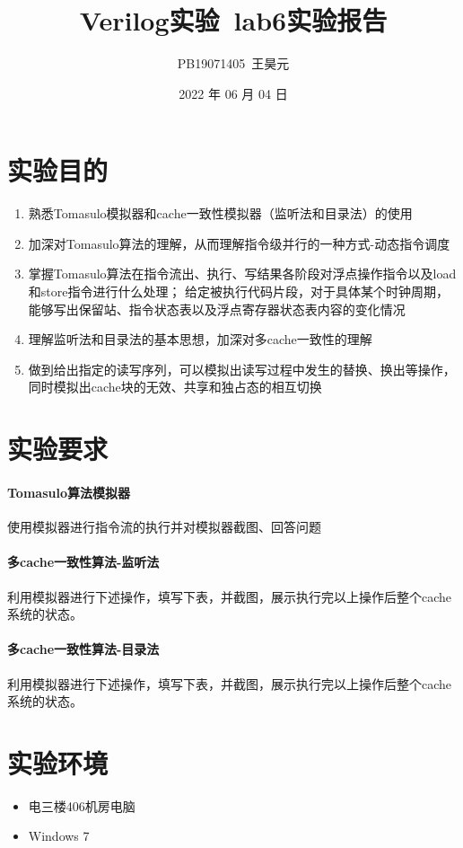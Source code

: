 \documentclass[UTF8]{article}
\title{Verilog实验\ lab6实验报告}
\author{PB19071405\ 王昊元}
\date{2022 年 06 月 04 日}
\begin{document}
    \maketitle
    \section{实验目的}
    \begin{enumerate}
        \item 熟悉Tomasulo模拟器和cache一致性模拟器（监听法和目录法）的使用
        \item 加深对Tomasulo算法的理解，从而理解指令级并行的一种方式-动态指令调度
        \item 掌握Tomasulo算法在指令流出、执行、写结果各阶段对浮点操作指令以及load和store指令进行什么处理；
        给定被执行代码片段，对于具体某个时钟周期，能够写出保留站、指令状态表以及浮点寄存器状态表内容的变化情况
        \item 理解监听法和目录法的基本思想，加深对多cache一致性的理解
        \item 做到给出指定的读写序列，可以模拟出读写过程中发生的替换、换出等操作，同时模拟出cache块的无效、共享和独占态的相互切换
    \end{enumerate}
    \section{实验要求}
    \paragraph{Tomasulo算法模拟器}
    使用模拟器进行指令流的执行并对模拟器截图、回答问题
    \paragraph{多cache一致性算法-监听法}
    利用模拟器进行下述操作，填写下表，并截图，展示执行完以上操作后整个cache系统的状态。
    \paragraph{多cache一致性算法-目录法}
    利用模拟器进行下述操作，填写下表，并截图，展示执行完以上操作后整个cache系统的状态。
    \section{实验环境}
    \begin{itemize}
        \item 电三楼406机房电脑
        \item Windows 7
    \end{itemize}
\end{document}
